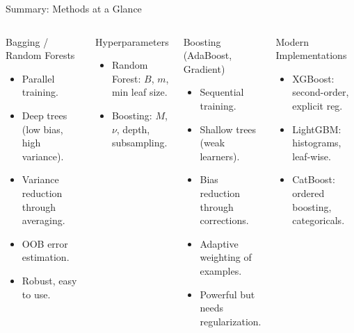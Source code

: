 \begin{frame}{Summary: Methods at a Glance}
  \begin{columns}[t]
      \begin{block}{Bagging / Random Forests}
        \begin{itemize}
          \item Parallel training.
          \item Deep trees (low bias, high variance).
          \item Variance reduction through averaging.
          \item OOB error estimation.
          \item Robust, easy to use.
        \end{itemize}
      \end{block}
      \vspace{0.4em}
      \begin{block}{Hyperparameters}
        \begin{itemize}
          \item Random Forest: $B$, $m$, min leaf size.
          \item Boosting: $M$, $\nu$, depth, subsampling.
        \end{itemize}
      \end{block}
      \begin{block}{Boosting (AdaBoost, Gradient)}
        \begin{itemize}
          \item Sequential training.
          \item Shallow trees (weak learners).
          \item Bias reduction through corrections.
          \item Adaptive weighting of examples.
          \item Powerful but needs regularization.
        \end{itemize}
      \end{block}
      \vspace{0.4em}
      \begin{block}{Modern Implementations}
        \begin{itemize}
          \item XGBoost: second-order, explicit reg.
          \item LightGBM: histograms, leaf-wise.
          \item CatBoost: ordered boosting, categoricals.
        \end{itemize}
      \end{block}
  \end{columns}
\end{frame}

